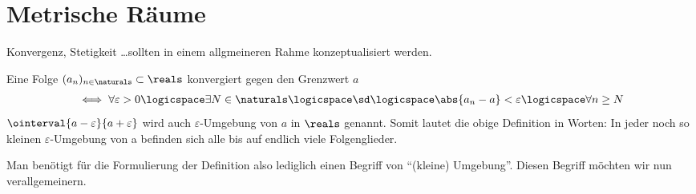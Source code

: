 \chapter{Metrische Räume}
\begin{ziel*}
    Konvergenz, Stetigkeit \ldots sollten in einem allgmeineren Rahme konzeptualisiert werden.
\end{ziel*}
\begin{erinnerung*}[\diffcourse{1}]
    Eine Folge \( (a_n)_{n\in \naturals}\subset \reals \) konvergiert gegen den Grenzwert \( a \)
    \begin{align*}
        \iff \forall \varepsilon>0 \logicspace\exists N\in \naturals\logicspace\text{\sd}\logicspace \abs{a_n-a}<\varepsilon\logicspace\forall n \geq N
    \end{align*}
    \( \ointerval{a-\varepsilon}{a+\varepsilon} \) wird auch \( \varepsilon \)-Umgebung von \( a \) in \( \reals \) genannt. 
    Somit lautet die obige Definition in Worten: 
    In jeder noch so kleinen \( \varepsilon \)-Umgebung von a befinden sich alle bis auf endlich viele Folgenglieder.    
\end{erinnerung*}
Man benötigt für die Formulierung der Definition also lediglich einen Begriff von \enquote{(kleine) Umgebung}. 
Diesen Begriff möchten wir nun verallgemeinern.
    
